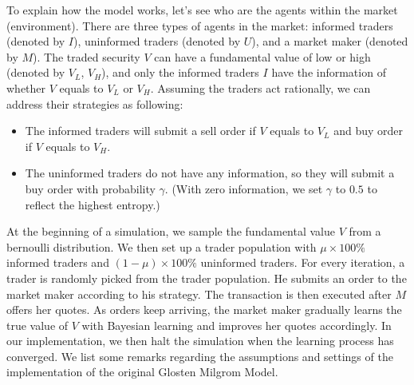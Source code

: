 \documentclass{article}
\begin{document}
To explain how the model works, let's see who are the agents within the market (environment). There are three types of agents in the market: informed traders (denoted by $I$), uninformed traders (denoted by $U$), and a market maker (denoted by $M$). The traded security $V$ can have a fundamental value of low or high (denoted by $V_L$, $V_H$), and only the informed traders $I$ have the information of whether $V$ equals to $V_L$ or $V_H$. Assuming the traders act rationally, we can address their strategies as following:

\begin{itemize}
    \item The informed traders will submit a sell order if $V$ equals to $V_L$ and buy order if $V$ equals to $V_H$.
    \item The uninformed traders do not have any information, so they will submit a buy order with probability $\gamma$. (With zero information, we set $\gamma$ to $0.5$ to reflect the highest entropy.\footnotemark{})
\end{itemize}

At the beginning of a simulation, we sample the fundamental value $V$ from a bernoulli distribution. We then set up a trader population with $\mu \times 100\%$ informed traders and $(1-\mu) \times 100\%$ uninformed traders. For every iteration, a trader is randomly picked from the trader population. He submits an order to the market maker according to his strategy. The transaction is then executed after $M$ offers her quotes. As orders keep arriving, the market maker gradually learns the true value of $V$ with Bayesian learning and improves her quotes accordingly. In our implementation, we then halt the simulation when the learning process has converged\footnotemark{}. We list some remarks regarding the assumptions and settings of the implementation of the original Glosten Milgrom Model.

\end{document}
